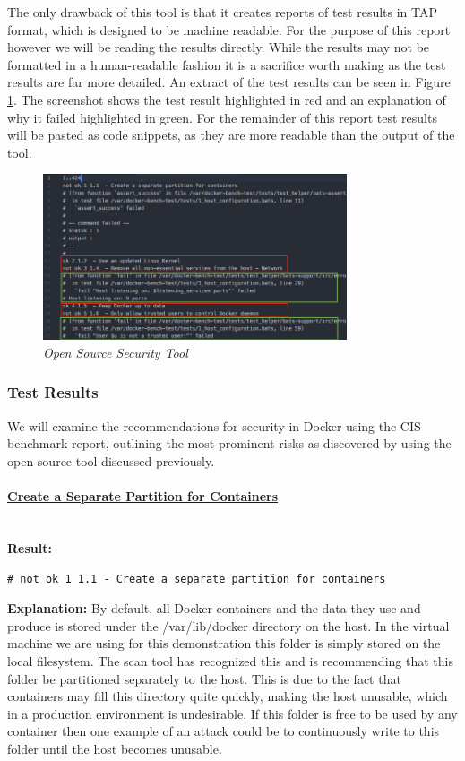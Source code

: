 \documentclass{article}
\begin{document}
The only drawback of this tool is that it creates reports of test results in TAP format, which is designed to be machine readable. For the purpose of this report however we will be reading the results directly. While the results may not be formatted in a human-readable fashion it is a sacrifice worth making as the test results are far more detailed. An extract of the test results can be seen in Figure \ref{fig:sec_tool}. The screenshot shows the test result highlighted in red and an explanation of why it failed highlighted in green. For the remainder of this report test results will be pasted as code snippets, as they are more readable than the output of the tool.

\begin{figure}[!h]
\centering
\includegraphics*[width=0.8\textwidth]{components/images/open-source-results}
\caption{\em Open Source Security Tool}
\label{fig:sec_tool}
\end{figure}

\newpage
\subsubsection{Test Results}
\label{subs:results}
We will examine the recommendations for security in Docker using the CIS benchmark report, outlining the most prominent risks as discovered by using the open source tool discussed previously. 


\paragraph{\underline{Create a Separate Partition for Containers}}\mbox{}\\

\textbf{Result:} 

\texttt{\# not ok 1 1.1  - Create a separate partition for containers}

\textbf{Explanation:} By default, all Docker containers and the data they use and produce is stored under the /var/lib/docker directory on the host. In the virtual machine we are using for this demonstration this folder is simply stored on the local filesystem. The scan tool has recognized this and is recommending that this folder be partitioned separately to the host. This is due to the fact that containers may fill this directory quite quickly, making the host unusable, which in a production environment is undesirable. If this folder is free to be used by any container then one example of an attack could be to continuously write to this folder until the host becomes unusable.
\end{document}
